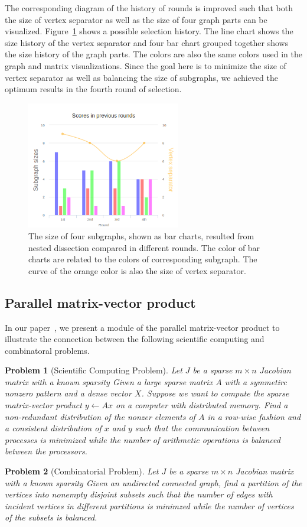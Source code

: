 \documentclass[12pt, twoside,a4paper,toc=bibliography]{scrbook}
\newtheorem{problem}{Problem}
\begin{document}
The corresponding diagram of the history of rounds is improved such that
both the size of vertex separator as well as the size of four graph parts
can be visualized. Figure~\ref{barchart} shows a possible selection history.
The line chart shows the size history of the vertex separator
and four bar chart grouped together shows the size history of the graph parts.
The colors are also the same colors used in the graph and matrix visualizations.
Since the goal here is to minimize the size of vertex separator as well as balancing the
size of subgraphs, we achieved the optimum results in the fourth round of selection.
\begin{figure}
\centering
\includegraphics[width=0.6\textwidth]{chart2}
\caption{The size of four subgraphs, shown as bar charts,
resulted from nested dissection compared in different rounds.
The color of bar charts are related to the colors of corresponding subgraph.
The curve of the orange color is also the size of vertex separator.}
\label{barchart}
\end{figure}

\subsection{Parallel matrix-vector product}
In our paper~\cite{2015:3}, we present a module of the parallel matrix-vector
product to illustrate the connection between the following scientific computing and combinatoral problems.
\begin{problem}[Scientific Computing Problem]
\label{p.par.mat.vec} Let $J$ be a sparse ${m\times n}$ Jacobian matrix with a known sparsity
Given a large sparse matrix $A$ with a symmetirc nonzero pattern and a dense
vector $X$. Suppose we want to compute the sparse matrix-vector product
$y \leftarrow Ax$ on a computer with distributed memory. Find a non-redundant
distribution of the nonzer elements of $A$ in a row-wise fashion and a
consistent distribution of $x$ and $y$ such that the communication between
processes is minimized while the number of arithmetic operations is balanced
between the processors.
\end{problem}
\begin{problem}[Combinatorial Problem]
\label{p.par.mat.vec.graph} Let $J$ be a sparse ${m\times n}$ Jacobian matrix with a known sparsity
Given an undirected connected graph, find a partition of the vertices into
nonempty disjoint subsets such that the number of edges with incident vertices
in different partitions is minimzed while the number of vertices of the subsets
is balanced.
\end{problem}
\end{document}

